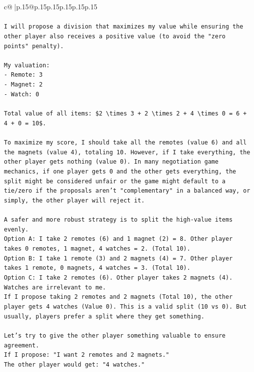 \documentclass{article}
\begin{document}
{\begin{supertabular}{c@{$\;$}|p{.15\linewidth}@{}p{.15\linewidth}p{.15\linewidth}p{.15\linewidth}p{.15\linewidth}p{.15\linewidth}}
{{{\\ 
\\ 
\texttt{I will propose a division that maximizes my value while ensuring the other player also receives a positive value (to avoid the "zero points" penalty).} \\
\\ 
\texttt{My valuation:} \\
\texttt{{-} Remote: 3} \\
\texttt{{-} Magnet: 2} \\
\texttt{{-} Watch: 0} \\
\\ 
\texttt{Total value of all items: \$2 \textbackslash{}times 3 + 2 \textbackslash{}times 2 + 4 \textbackslash{}times 0 = 6 + 4 + 0 = 10\$.} \\
\\ 
\texttt{To maximize my score, I should take all the remotes (value 6) and all the magnets (value 4), totaling 10. However, if I take everything, the other player gets nothing (value 0). In many negotiation game mechanics, if one player gets 0 and the other gets everything, the split might be considered unfair or the game might default to a tie/zero if the proposals aren't "complementary" in a balanced way, or simply, the other player will reject it.} \\
\\ 
\texttt{A safer and more robust strategy is to split the high{-}value items evenly.} \\
\texttt{Option A: I take 2 remotes (6) and 1 magnet (2) = 8. Other player takes 0 remotes, 1 magnet, 4 watches = 2. (Total 10).} \\
\texttt{Option B: I take 1 remote (3) and 2 magnets (4) = 7. Other player takes 1 remote, 0 magnets, 4 watches = 3. (Total 10).} \\
\texttt{Option C: I take 2 remotes (6). Other player takes 2 magnets (4). Watches are irrelevant to me.} \\
\texttt{If I propose taking 2 remotes and 2 magnets (Total 10), the other player gets 4 watches (Value 0). This is a valid split (10 vs 0). But usually, players prefer a split where they get something.} \\
\\ 
\texttt{Let's try to give the other player something valuable to ensure agreement.} \\
\texttt{If I propose: "I want 2 remotes and 2 magnets."} \\
\texttt{The other player would get: "4 watches."} \\
}}}
\end{supertabular}}
\end{document}
